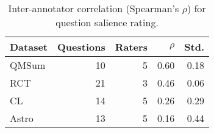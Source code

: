\begin{table}[t]
\small
\centering
\begin{tabular}{lrrrr}
\toprule
\bfseries Dataset & \bfseries Questions & \bfseries Raters & \bfseries $\rho$ & \bfseries Std. \\
\midrule
QMSum & 10 & 5 & 0.60 & 0.18 \\
RCT & 21 & 3 & 0.46 & 0.06 \\
CL & 14 & 5 & 0.26 & 0.29 \\
Astro & 13 & 5 & 0.16 & 0.44 \\
\bottomrule
\end{tabular}

\caption{Inter-annotator correlation (Spearman's $\rho$) for question salience rating.}
\label{tab:annotator-agreement}
\end{table}
